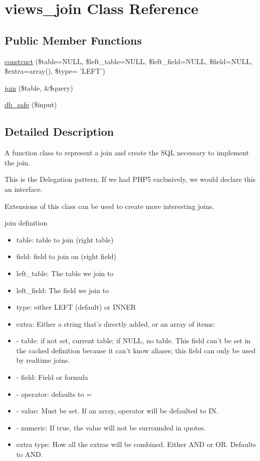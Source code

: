 \hypertarget{classviews__join}{
\section{views\_\-join Class Reference}
\label{classviews__join}
}
\subsection*{Public Member Functions}
\begin{CompactItemize}
\item 
\hyperlink{classviews__join_c6c6e70389e0c59e4b068903ef4950b9}{construct} (\$table=NULL, \$left\_\-table=NULL, \$left\_\-field=NULL, \$field=NULL, \$extra=array(), \$type= 'LEFT')
\item 
\hyperlink{classviews__join_9314539b413d4eaf3c7b4fc7707ead01}{join} (\$table, \&\$query)
\item 
\hyperlink{classviews__join_754d61d9f26180fb155238475122308d}{db\_\-safe} (\$input)
\end{CompactItemize}


\subsection{Detailed Description}
A function class to represent a join and create the SQL necessary to implement the join.

This is the Delegation pattern. If we had PHP5 exclusively, we would declare this an interface.

Extensions of this class can be used to create more interesting joins.

join definition\begin{itemize}
\item table: table to join (right table)\item field: field to join on (right field)\item left\_\-table: The table we join to\item left\_\-field: The field we join to\item type: either LEFT (default) or INNER\item extra: Either a string that's directly added, or an array of items:\item - table: if not set, current table; if NULL, no table. This field can't be set in the cached definition because it can't know aliases; this field can only be used by realtime joins.\item - field: Field or formula\item - operator: defaults to =\item - value: Must be set. If an array, operator will be defaulted to IN.\item - numeric: If true, the value will not be surrounded in quotes.\item extra type: How all the extras will be combined. Either AND or OR. Defaults to AND. \end{itemize}


